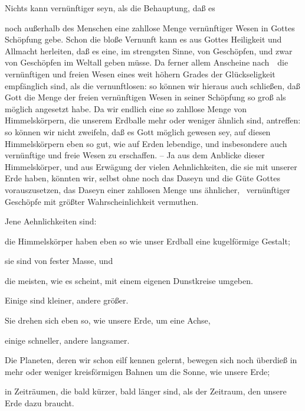 \begin{aufza}
\item Nichts kann vernünftiger seyn, als die Behauptung, daß es
\begin{aufzb}
\item noch außerhalb des Menschen eine zahllose Menge vernünftiger Wesen in Gottes Schöpfung gebe. Schon die bloße Vernunft kann es aus Gottes Heiligkeit und Allmacht herleiten, daß es eine, im strengsten Sinne,  von Geschöpfen, und zwar von  Geschöpfen im Weltall geben müsse. Da ferner allem Anscheine nach~\ die vernünftigen und freien Wesen eines weit höhern Grades der Glückseligkeit empfänglich sind, als die vernunftlosen: so können wir hieraus auch schließen, daß Gott die Menge der freien vernünftigen Wesen in seiner Schöpfung so groß als möglich angesetzt habe. Da wir endlich eine so zahllose Menge von Himmelskörpern, die unserem Erdballe mehr oder weniger ähnlich sind, antreffen: so können wir nicht zweifeln, daß es Gott möglich gewesen sey, auf diesen Himmelskörpern eben so gut, wie auf Erden lebendige, und insbesondere auch vernünftige und freie Wesen zu erschaffen. -- Ja aus dem Anblicke dieser Himmelskörper, und aus Erwägung der vielen Aehnlichkeiten, die sie mit unserer Erde haben, könnten wir, selbst ohne noch das Daseyn und die Güte Gottes vorauszusetzen, das Daseyn einer zahllosen Menge uns ähnlicher, \dh\ vernünftiger Geschöpfe mit größter Wahrscheinlichkeit vermuthen.\par
Jene Aehnlichkeiten sind:
\begin{aufzc}
\item die Himmelskörper haben eben so wie unser Erdball eine kugelförmige Gestalt;
\item sie sind von fester Masse, und
\item die meisten, wie es scheint, mit einem eigenen Dunstkreise umgeben.
\item Einige sind kleiner, andere größer.
\item Sie drehen sich eben so, wie unsere Erde, um eine Achse,
\item einige schneller, andere langsamer. 
\item Die Planeten, deren wir schon eilf kennen gelernt, bewegen sich noch überdieß in mehr oder weniger kreisförmigen Bahnen um die Sonne, wie unsere Erde;
\item in Zeiträumen, die bald kürzer, bald länger sind, als der Zeitraum, den unsere Erde dazu braucht.

\end{aufzc}
\end{aufzb}
\end{aufza}
